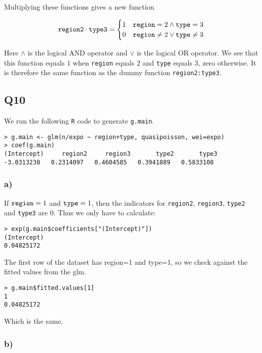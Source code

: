 \documentclass[11pt]{article}
\begin{document}
Multiplying these functions gives a new function

\begin{equation}
\verb|region2| \cdot \verb|type3| = 
\begin{cases}
1 & \verb|region| = 2 \land \verb|type| = 3 \\
0 & \verb|region| \neq 2 \lor \verb|type| \neq 3
\end{cases}
\end{equation}

Here $\land$ is the logical AND operator and $\lor$ is the logical OR operator. We see that this function equals $1$ when \verb|region| equals $2$ and \verb|type| equals $3$, zero otherwise. It is therefore the same function as the dummy function \verb|region2:type3|.

\subsection*{Q10}

We run the following \verb|R| code to generate \verb|g.main|.

\begin{verbatim}
> g.main <- glm(n/expo ~ region+type, quasipoisson, wei=expo)
> coef(g.main)
(Intercept)     region2     region3       type2       type3 
-3.0313238   0.2314097   0.4604585   0.3941889   0.5833108 
\end{verbatim}

\subsubsection*{a)}

If $\verb|region|=1$ and $\verb|type|=1$, then the indicators for \verb|region2|, \verb|region3|, \verb|type2| and \verb|type3| are $0$. Thus we only have to calculate:
\begin{verbatim}
> exp(g.main$coefficients["(Intercept)"])
(Intercept) 
0.04825172 
\end{verbatim}

The first row of the dataset has region=1 and type=1, so we check against the fitted values from the glm.
\begin{verbatim}
> g.main$fitted.values[1]
1 
0.04825172 
\end{verbatim}

Which is the same.

\subsubsection*{b)}
\end{document}
